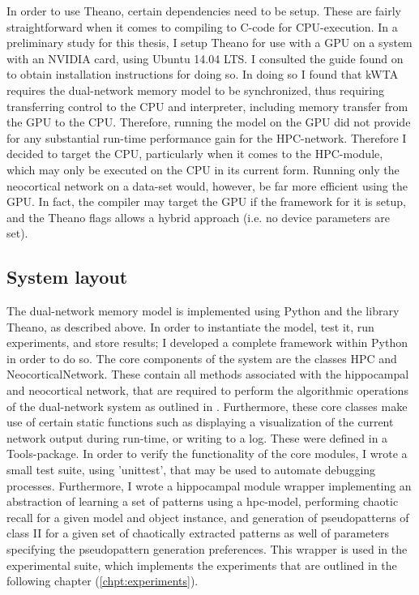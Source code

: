 In order to use Theano, certain dependencies need to be setup. These are fairly straightforward when it comes to compiling to C-code for CPU-execution. In a preliminary study for this thesis, I setup Theano for use with a GPU on a system with an NVIDIA card, using Ubuntu 14.04 LTS. I consulted the guide found on \citep{LISA-lab2015b} to obtain installation instructions for doing so. In doing so I found that kWTA requires the dual-network memory model to be synchronized, thus requiring transferring control to the CPU and interpreter, including memory transfer from the GPU to the CPU. Therefore, running the model on the GPU did not provide for any substantial run-time performance gain for the HPC-network. Therefore I decided to target the CPU, particularly when it comes to the HPC-module, which may only be executed on the CPU in its current form. Running only the neocortical network on a data-set would, however, be far more efficient using the GPU. In fact, the compiler may target the GPU if the framework for it is setup, and the Theano flags allows a hybrid approach (i.e. no device parameters are set).

\subsection{System layout}

The dual-network memory model is implemented using Python and the library Theano, as described above. In order to instantiate the model, test it, run experiments, and store results; I developed a complete framework within Python in order to do so. The core components of the system are the classes HPC and NeocorticalNetwork. These contain all methods associated with the hippocampal and neocortical network, that are required to perform the algorithmic operations of the dual-network system as outlined in \citep{Hattori2014}. Furthermore, these core classes make use of certain static functions such as displaying a visualization of the current network output during run-time, or writing to a log. These were defined in a Tools-package. In order to verify the functionality of the core modules, I wrote a small test suite, using 'unittest', that may be used to automate debugging processes. Furthermore, I wrote a hippocampal module wrapper implementing an abstraction of learning a set of patterns using a hpc-model, performing chaotic recall for a given model and object instance, and generation of pseudopatterns of class II for a given set of chaotically extracted patterns as well of parameters specifying the pseudopattern generation preferences. This wrapper is used in the experimental suite, which implements the experiments that are outlined in the following chapter (\ref{chpt:experiments}).

